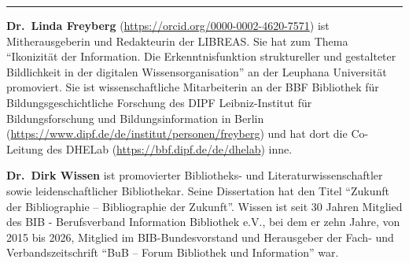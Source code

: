 \begin{center}\rule{0.5\linewidth}{0.5pt}\end{center}

\textbf{Dr.~Linda Freyberg}
(\url{https://orcid.org/0000-0002-4620-7571}) ist Mitherausgeberin und
Redakteurin der LIBREAS. Sie hat zum Thema \enquote{Ikonizität der Information.
Die Erkenntnisfunktion struktureller und gestalteter Bildlichkeit in der
digitalen Wissensorganisation} an der Leuphana Universität promoviert.
Sie ist wissenschaftliche Mitarbeiterin an der BBF \textbar{} Bibliothek
für Bildungsgeschichtliche Forschung des DIPF \textbar{}
Leibniz-Institut für Bildungsforschung und Bildungsinformation in Berlin
(\url{https://www.dipf.de/de/institut/personen/freyberg}) und hat dort
die Co-Leitung des DHELab (\url{https://bbf.dipf.de/de/dhelab}) inne.

\textbf{Dr.~Dirk Wissen} ist promovierter Bibliotheks- und
Literaturwissenschaftler sowie leidenschaftlicher Bibliothekar. Seine
Dissertation hat den Titel \enquote{Zukunft der Bibliographie -- Bibliographie
der Zukunft}. Wissen ist seit 30 Jahren Mitglied des BIB -
Berufsverband Information Bibliothek e.V., bei dem er zehn Jahre, von
2015 bis 2026, Mitglied im BIB-Bundesvorstand und Herausgeber der Fach-
und Verbandszeitschrift \enquote{BuB -- Forum Bibliothek und Information} war.
